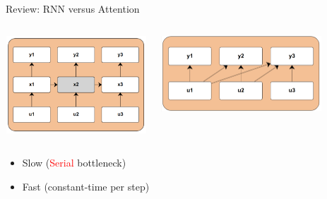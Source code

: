\begin{frame}{Review: RNN versus Attention}
    \begin{columns}
    \begin{column}{0.5\textwidth}
        \centering
        \includegraphics[width=.8\textwidth]{Figs/rnn.png}
    \end{column}
    \begin{column}{0.5\textwidth}
        \centering
  
        \includegraphics[width=0.8\textwidth]{Figs/out5.png}
    \end{column}
    \end{columns}
    \vspace{0.5cm}
    
\begin{itemize}
    \item {} Slow (\textcolor{red}{Serial} bottleneck)
    \item {} Fast (constant-time per step)
    
\end{itemize}
\end{frame}


